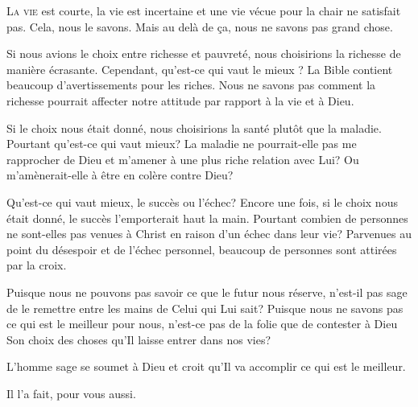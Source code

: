 \lettrine{L}{a vie} est courte, la vie est incertaine et une vie vécue
 pour la chair ne satisfait pas. Cela, nous le savons.
 Mais au delà de \c{c}a, nous ne savons pas grand chose. 

Si nous avions le choix entre richesse et pauvreté,
 nous choisirions la richesse de manière écrasante.
 Cependant, 
 qu'est-ce qui vaut le mieux ? 
 La Bible contient beaucoup d'avertissements pour les riches.
 Nous ne savons pas comment la richesse pourrait affecter
 notre attitude par rapport à la vie et à Dieu. 


Si le choix nous était donné, nous choisirions la santé
 plutôt que la maladie. Pourtant qu'est-ce qui vaut mieux?
 La maladie ne pourrait-elle pas me rapprocher de Dieu
 et m'amener à une plus riche relation avec Lui?
 Ou m'amènerait-elle à être en colère contre Dieu? 

Qu'est-ce qui vaut mieux, le succès ou l'échec?
 Encore une fois, si le choix nous était donné,
 le succès l'emporterait haut la main.
 Pourtant combien de personnes ne sont-elles pas venues à Christ
 en raison d'un échec dans leur vie?
 Parvenues au point du désespoir et de l'échec personnel,
 beaucoup de personnes sont attirées par la croix. 

Puisque nous ne pouvons pas savoir ce que le futur nous réserve,
 n'est-il pas sage de le remettre entre les mains de Celui qui Lui sait?
 Puisque nous ne savons pas ce qui est le meilleur pour nous,
 n'est-ce pas de la folie que de contester à Dieu Son choix des choses
 qu'Il laisse entrer dans nos vies? 

L'homme sage se soumet à Dieu et croit qu'Il va accomplir
 ce qui est le meilleur. 

Il l'a fait, pour vous aussi.

\dvrule






